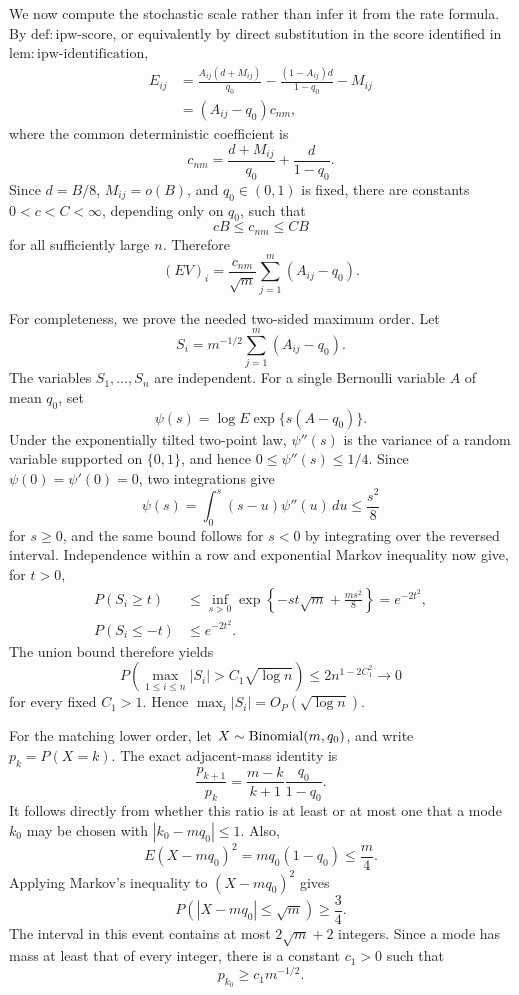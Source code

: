 We now compute the stochastic scale rather than infer it from the rate formula.  By \(\mathrm{def:ipw\mbox{-}score}\), or equivalently by direct substitution in the score identified in \(\mathrm{lem:ipw\mbox{-}identification}\),
\[
 \begin{aligned}
 E_{ij}
 &=\frac{A_{ij}(d+M_{ij})}{q_0}
   -\frac{(1-A_{ij})d}{1-q_0}-M_{ij}\\
 &=(A_{ij}-q_0)c_{nm},
 \end{aligned}
\]
where the common deterministic coefficient is
\[
 c_{nm}
 =\frac{d+M_{ij}}{q_0}+\frac d{1-q_0}.
\]
Since \(d=B/8\), \(M_{ij}=o(B)\), and \(q_0\in(0,1)\) is fixed, there are constants \(0<c<C<\infty\), depending only on \(q_0\), such that
\[
 cB\le c_{nm}\le CB
\]
for all sufficiently large \(n\).  Therefore
\[
 (EV)_i
 =\frac{c_{nm}}{\sqrt m}\sum_{j=1}^m(A_{ij}-q_0).
\]

For completeness, we prove the needed two-sided maximum order.  Let
\[
 S_i=m^{-1/2}\sum_{j=1}^m(A_{ij}-q_0).
\]
The variables \(S_1,\ldots,S_n\) are independent.  For a single Bernoulli variable \(A\) of mean \(q_0\), set
\[
 \psi(s)=\log E\exp\{s(A-q_0)\}.
\]
Under the exponentially tilted two-point law, \(\psi''(s)\) is the variance of a random variable supported on \(\{0,1\}\), and hence \(0\le\psi''(s)\le1/4\).  Since \(\psi(0)=\psi'(0)=0\), two integrations give
\[
 \psi(s)=\int_0^s(s-u)\psi''(u)\,du\le\frac{s^2}{8}
\]
for \(s\ge0\), and the same bound follows for \(s<0\) by integrating over the reversed interval.  Independence within a row and exponential Markov inequality now give, for \(t>0\),
\[
 \begin{aligned}
 P(S_i\ge t)
 &\le\inf_{s>0}
 \exp\left\{-st\sqrt m+\frac{ms^2}{8}\right\}
 =e^{-2t^2},\\
 P(S_i\le-t)&\le e^{-2t^2}.
 \end{aligned}
\]
The union bound therefore yields
\[
 P\!\left(\max_{1\le i\le n}|S_i|>C_1\sqrt{\log n}\right)
 \le2n^{1-2C_1^2}\longrightarrow0
\]
for every fixed \(C_1>1\).  Hence \(\max_i|S_i|=O_P(\sqrt{\log n})\).

For the matching lower order, let \(X\sim{\rm Binomial}(m,q_0)\), and write \(p_k=P(X=k)\).  The exact adjacent-mass identity is
\[
 \frac{p_{k+1}}{p_k}
 =\frac{m-k}{k+1}\frac{q_0}{1-q_0}.
\]
It follows directly from whether this ratio is at least or at most one that a mode \(k_0\) may be chosen with \(|k_0-mq_0|\le1\).  Also,
\[
 E(X-mq_0)^2=mq_0(1-q_0)\le\frac m4.
\]
Applying Markov's inequality to \((X-mq_0)^2\) gives
\[
 P(|X-mq_0|\le\sqrt m)\ge\frac34.
\]
The interval in this event contains at most \(2\sqrt m+2\) integers.  Since a mode has mass at least that of every integer, there is a constant \(c_1>0\) such that
\[
 p_{k_0}\ge c_1m^{-1/2}.
\]


